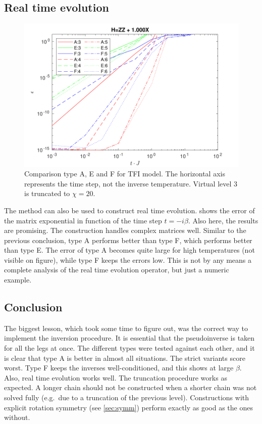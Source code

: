 \subsection{Real time evolution} \label{subsec_rt_evo}

\begin{figure}[!htbp]
    \center
    \includegraphics[width=\textwidth]{Figuren/benchmarking/1D_t_ising_time.pdf}
    \caption{Comparison type A, E and F for \Gls{TFI} model. The horizontal axis represents the time step, not the inverse temperature. Virtual level 3 is truncated to $\chi=20$.  }
    \label{fig:benchmark:tising_time}
\end{figure}

The method can also be used to construct real time evolution.  shows the error of the matrix exponential in function of the time step $t = -i \beta $. Also here, the results are promising. The construction handles complex matrices well. Similar to the previous conclusion, type A performs better than type F, which performs better than type E. The error of type A becomes quite large for high temperatures (not visible on figure), while type F keeps the errors low. This is not by any means a complete analysis of the real time evolution operator, but just a numeric example.

\subsection{Conclusion}

The biggest lesson, which took some time to figure out, was the correct way to implement the inversion procedure. It is essential that the pseudoinverse is taken for all the legs at once. The different types were tested against each other, and it is clear that type A is better in almost all situations. The strict variants score worst. Type F keeps the inverses well-conditioned, and this shows at large $\beta$. Also, real time evolution works well. The truncation procedure works as expected. A longer chain should not be constructed when a shorter chain was not solved fully (e.g.\ due to a truncation of the previous level). Constructions with explicit rotation symmetry (see \cref{sec:symm}) perform exactly as good as the ones without.